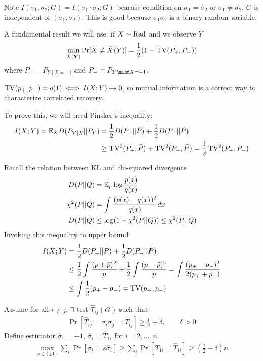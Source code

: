 Note $I(\sigma_1, \sigma_2; G) = I(\sigma_1 \cdot \sigma_2; G)$
beacuse condition on $\sigma_1 = \sigma_2$ or $\sigma_1 \neq \sigma_2$,
$G$ is independent of $(\sigma_1, \sigma_2)$.
This is good because $\sigma_1 \sigma_2$ is a binary random variable.

A fundamental result we will use: if $X \sim \text{Rad}$ and we observe $Y$
\begin{align}
  \min_{\hat{X}(Y)} \Pr[X \neq \hat{X}(Y)] = \frac{1}{2}(1 - \operatorname{TV}(P_+, P_-))
\end{align}
where $P_+ = P_{Y \mid X = +1}$ and $P_- = P_{Y \mind X=-1}$.

\begin{proposition}
  $\operatorname{TV}(p_+, p_-) = o(1) \iff I(X;Y) \to 0$, so mutual information is a correct
  way to characterize correlated recovery.
\end{proposition}

To prove this, we will need Pinsker's inequality:
\begin{align}
  I(X;Y)
  = \mathbb{E}_X D(P_{Y \mid X} || P_Y)
  &= \frac{1}{2} D(P_+ || \bar{P}) + \frac{1}{2} D(P_- || \bar{P}) \\
  &\geq \operatorname{TV}^2(P_+, \bar{P}) + \operatorname{TV}^2(P_-, \bar{P})
  = \frac{1}{2}  \operatorname{TV}^2(P_+, P_-)
\end{align}

Recall the relation between KL and chi-squared divergence
\begin{align}
  D(P||Q) &= \mathbb{E}_p \log \frac{p(x)}{q(x)}  \\
  \chi^2(P||Q) &= \int \frac{(p(x) - q(x))^2}{q(x)} dx \\
  D(P || Q) &\leq \log(1 + \chi^2(P || Q)) \leq \chi^2(P || Q)
\end{align}
Invoking this inequality to upper bound
\begin{align}
  I(X;Y)
  &= \frac{1}{2} D(P_+ || \bar{P}) + \frac{1}{2} D(P_- || \bar{P}) \\
  &\leq \frac{1}{2} \int \frac{(p + \bar{p})^2}{\bar{p}}  + \frac{1}{2}  \int \frac{(p - \bar{p})^2}{\bar{p}} = \int \frac{(p_+ - p_-)^2}{2 (p_+ + p_-)} \\
  &\leq \int \frac{1}{2} (p_+ - p_-)
  = \operatorname{TV}(p_+, p_-)
\end{align}

Assume for all $i \neq j$, $\exists$ test $\hat{T}_{ij}(G)$ such that
\begin{align}
  \Pr[\hat{T}_{ij} = \sigma_i \sigma_j \eqqcolon T_{ij}] \geq \frac{1}{2}  + \delta, \qquad \delta > 0
\end{align}
Define estimator $\hat{\sigma}_1 = +1$, $\hat\sigma_i = \hat{T}_{1i}$ for $i=2,\ldots,n$.
\begin{align}
  \max_{s \in \{\pm 1\}} \sum_i \Pr[\sigma_i = s \hat\sigma_i]
  \geq \sum_i \Pr[T_{1i} =\hat{T}_{1i}] \geq \left(\frac{1}{2}  + \delta\right) n
\end{align}

